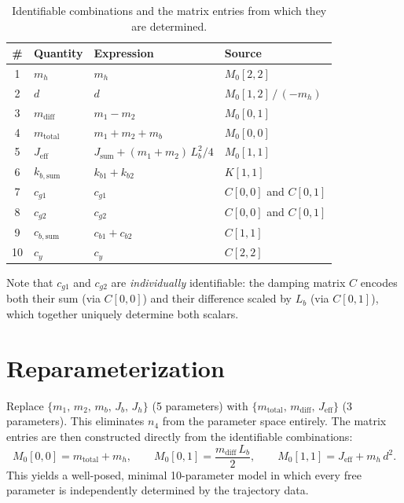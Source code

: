 \documentclass[11pt,a4paper]{article}
\begin{document}
\begin{table}[h]
\centering
\caption{Identifiable combinations and the matrix entries from which they
         are determined.}
\label{tab:identifiable}
\begin{tabular}{clll}
\toprule
\# & Quantity & Expression & Source \\
\midrule
1  & $m_h$                & $m_h$                                         & $M_0[2,2]$ \\
2  & $d$                  & $d$                                           & $M_0[1,2]\,/\,(-m_h)$ \\
3  & $m_\mathrm{diff}$    & $m_1 - m_2$                                   & $M_0[0,1]$ \\
4  & $m_\mathrm{total}$   & $m_1 + m_2 + m_b$                             & $M_0[0,0]$ \\
5  & $J_\mathrm{eff}$     & $J_\mathrm{sum} + (m_1+m_2)\,L_b^2/4$        & $M_0[1,1]$ \\
6  & $k_{b,\mathrm{sum}}$ & $k_{b1}+k_{b2}$                               & $K[1,1]$ \\
7  & $c_{g1}$             & $c_{g1}$                                      & $C[0,0]$ and $C[0,1]$ \\
8  & $c_{g2}$             & $c_{g2}$                                      & $C[0,0]$ and $C[0,1]$ \\
9  & $c_{b,\mathrm{sum}}$ & $c_{b1}+c_{b2}$                               & $C[1,1]$ \\
10 & $c_y$                & $c_y$                                         & $C[2,2]$ \\
\bottomrule
\end{tabular}
\end{table}

Note that $c_{g1}$ and $c_{g2}$ are \emph{individually} identifiable: the
damping matrix $C$ encodes both their sum (via $C[0,0]$) and their
difference scaled by $L_b$ (via $C[0,1]$), which together uniquely
determine both scalars.

\section{Reparameterization}
\label{sec:reparam}

Replace $\{m_1,\,m_2,\,m_b,\,J_b,\,J_h\}$ (5 parameters) with
$\{m_\mathrm{total},\,m_\mathrm{diff},\,J_\mathrm{eff}\}$ (3 parameters).
This eliminates $n_4$ from the parameter space entirely.
The matrix entries are then constructed directly from the identifiable
combinations:
\begin{equation}
    M_0[0,0] = m_\mathrm{total} + m_h, \qquad
    M_0[0,1] = \frac{m_\mathrm{diff}\,L_b}{2}, \qquad
    M_0[1,1] = J_\mathrm{eff} + m_h\,d^2.
\end{equation}
This yields a well-posed, minimal 10-parameter model in which every free
parameter is independently determined by the trajectory data.
\end{document}
